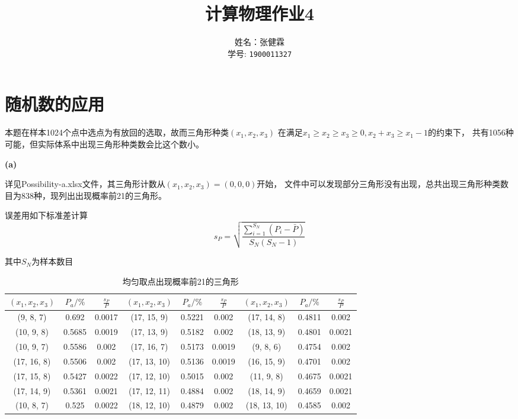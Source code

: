\documentclass[UTF8]{ctexart}
\begin{document}
\title{计算物理作业4}
\author{姓名：张健霖\\学号: \texttt{1900011327}}
\maketitle


\section{随机数的应用}

本题在样本1024个点中选点为有放回的选取，故而三角形种类$(x_1,x_2,x_3)$
在满足$x_1\geq x_2\geq x_3\geq 0, x_2+x_3\geq x_1-1$的约束下，
共有1056种可能，但实际体系中出现三角形种类数会比这个数小。

\noindent\textbf{(a)}

详见Possibility-a.xlsx文件，其三角形计数从$(x_1,x_2,x_3)=(0,0,0)$开始，
文件中可以发现部分三角形没有出现，总共出现三角形种类数目为838种，现列出出现概率前21的三角形。

误差用如下标准差计算
\begin{equation}\label{1-a-1}
    s_P=\sqrt{\frac{\sum_{i=1}^{S_N}(P_i-\bar{P})}{S_N(S_N-1)}}
\end{equation}

其中$S_N$为样本数目

\begin{table}[H]
    \centering
    \caption{均匀取点出现概率前21的三角形}
    \begin{tabular}{|ccc|ccc|ccc|}
        \hline
        $(x_1,x_2,x_3)$ & $P_a/\%$ & $\frac{s_P}{P}$ & $(x_1,x_2,x_3)$ & $P_a/\%$ & $\frac{s_P}{P}$ & $(x_1,x_2,x_3)$ & $P_a/\%$ & $\frac{s_P}{P}$\\
        \hline
        (9, 8, 7)&0.692&0.0017&(17, 15, 9)&0.5221&0.002&(17, 14, 8)&0.4811&0.002\\
(10, 9, 8)&0.5685&0.0019&(17, 13, 9)&0.5182&0.002&(18, 13, 9)&0.4801&0.0021\\
(10, 9, 7)&0.5586&0.002&(17, 16, 7)&0.5173&0.0019&(9, 8, 6)&0.4754&0.002\\
(17, 16, 8)&0.5506&0.002&(17, 13, 10)&0.5136&0.0019&(16, 15, 9)&0.4701&0.002\\
(17, 15, 8)&0.5427&0.0022&(17, 12, 10)&0.5015&0.002&(11, 9, 8)&0.4675&0.0021\\
(17, 14, 9)&0.5361&0.0021&(17, 12, 11)&0.4884&0.002&(18, 14, 9)&0.4659&0.0021\\
(10, 8, 7)&0.525&0.0022&(18, 12, 10)&0.4879&0.002&(18, 13, 10)&0.4585&0.002\\
\hline
    \end{tabular}
\end{table}
\end{document}

